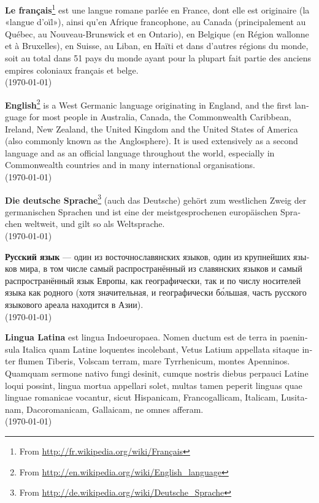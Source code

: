 \documentclass[a4paper]{article}
\begin{document}
\noindent
\textbf{Le français}\footnote{ From \url{http://fr.wikipedia.org/wiki/Français}} est une langue romane parlée en France, dont elle est originaire (la «langue d'oïl»), ainsi qu'en Afrique francophone, au Canada (principalement au Québec, au Nouveau-Brunswick et en Ontario), en Belgique (en Région wallonne et à Bruxelles), en Suisse, au Liban, en Haïti et dans d'autres régions du monde, soit au total dans 51 pays du monde ayant pour la plupart fait partie des anciens empires coloniaux français et belge. \\
(\today)

\begin{english}
  \textbf{English}\footnote{From \url{http://en.wikipedia.org/wiki/English_language}} is a West Germanic language originating in England, and the first language for most people in Australia, Canada, the Commonwealth Caribbean, Ireland, New Zealand, the United Kingdom and the United States of America (also commonly known as the Anglosphere). It is used extensively as a second language and as an official language throughout the world, especially in Commonwealth countries and in many international organisations. \\
  (\today)
\end{english}

\begin{german}
  \textbf{Die deutsche Sprache}\footnote{ From \url{http://de.wikipedia.org/wiki/Deutsche_Sprache}} (auch das Deutsche) gehört zum westlichen Zweig der germanischen Sprachen und ist eine der meistgesprochenen europäischen Sprachen weltweit, und gilt so als Weltsprache.\\
  (\today)
\end{german}

\begin{russian}
  \textbf{Русский язык} — один из восточнославянских языков, один из крупнейших языков мира, в том числе самый распространённый из славянских языков и самый распространённый язык Европы, как географически, так и по числу носителей языка как родного (хотя значительная, и географически бо́льшая, часть русского языкового ареала находится в Азии).	\\
  (\today)
\end{russian}

\begin{latin}
  \textbf{Lingua Latina} est lingua Indoeuropaea. Nomen ductum est de terra in paeninsula Italica quam Latine loquentes incolebant, Vetus Latium appellata sitaque inter flumen Tiberis, Volscam terram, mare Tyrrhenicum, montes Apenninos.
  Quamquam sermone nativo fungi desinit, cumque nostris diebus perpauci Latine loqui possint, lingua mortua appellari solet, multas tamen peperit linguas quae linguae romanicae vocantur, sicut Hispanicam, Francogallicam, Italicam, Lusitanam, Dacoromanicam, Gallaicam, ne omnes afferam. \\
  (\today)
\end{latin}
\end{document}
